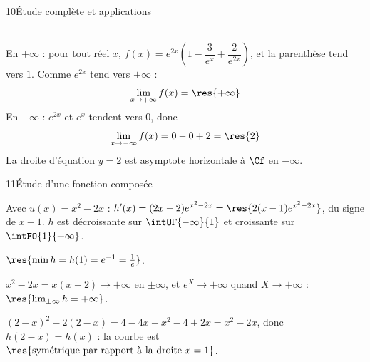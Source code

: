 \begin{corrige}{10}{Étude complète et applications}
\begin{questions}[start=6]
  \item {}\\
    En $+\infty$ : pour tout réel $x$, $f(x)=e^{2x}\left(1-\dfrac{3}{e^{x}}+\dfrac{2}{e^{2x}}\right)$,
    et la parenthèse tend vers $1$. Comme $e^{2x}$ tend vers $+\infty$ :
    \[ \lim_{x\to+\infty}f(x)=\res{+\infty} \]
    En $-\infty$ : $e^{2x}$ et $e^{x}$ tendent vers $0$, donc
    \[ \lim_{x\to-\infty}f(x)=0-0+2=\res{2} \]
    La droite d'équation $y=2$ est asymptote horizontale à $\Cf$ en $-\infty$.
\end{questions}
\end{corrige}

\begin{corrige}{11}{Étude d'une fonction composée}
\noindent
\begin{minipage}[t]{0.54\linewidth}\vspace{0pt}\raggedright
\begin{questions}
  \item Avec $u(x)=x^{2}-2x$ : $h'(x)=(2x-2)e^{x^{2}-2x}=\res{2(x-1)e^{x^{2}-2x}}$, du signe de $x-1$. $h$ est décroissante sur
    $\intOF{-\infty}{1}$ et croissante sur $\intFO{1}{+\infty}$.
  \item $\res{\min h=h(1)=e^{-1}=\frac1e}$.
  \item $x^{2}-2x=x(x-2)\to+\infty$ en $\pm\infty$, et $e^{X}\to+\infty$ quand $X\to+\infty$ : $\res{\lim_{\pm\infty}h=+\infty}$.
  \item $(2-x)^{2}-2(2-x)=4-4x+x^{2}-4+2x=x^{2}-2x$, donc $h(2-x)=h(x)$ : la courbe est $\res{\text{symétrique par rapport à la droite }x=1}$.
\end{questions}
\end{minipage}\hfill
\begin{minipage}[t]{0.42\linewidth}\vspace{1mm}
\centering
\begin{tableau}
\end{tableau}
\end{minipage}
\end{corrige}

